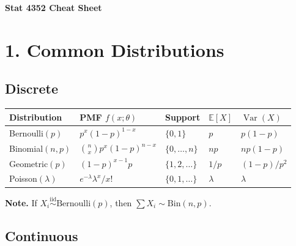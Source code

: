 \documentclass[11pt]{article}
\newcommand{\bbE}{\mathbb{E}}
\newcommand{\Var}{\operatorname{Var}}
\begin{document}
\begin{center}
  {\large\textbf{Stat 4352 Cheat Sheet}}
\end{center}

\section*{1.\; Common Distributions}

\subsection*{Discrete}

\renewcommand{\arraystretch}{1.4}
\begin{tabular}{lllll}
  \toprule
  \textbf{Distribution} & \textbf{PMF} $f(x;\theta)$ &
  \textbf{Support} & $\bbE[X]$ & $\Var(X)$ \\
  \midrule
  Bernoulli$(p)$ & $p^x(1-p)^{1-x}$ & $\{0,1\}$ & $p$ & $p(1-p)$ \\
  Binomial$(n,p)$ & $\binom{n}{x}p^x(1-p)^{n-x}$ & $\{0,\ldots,n\}$ &
  $np$ & $np(1-p)$ \\
  Geometric$(p)$ & $(1-p)^{x-1}p$ & $\{1,2,\ldots\}$ & $1/p$ & $(1-p)/p^2$ \\
  Poisson$(\lambda)$ & $e^{-\lambda}\lambda^x/x!$ & $\{0,1,\ldots\}$
  & $\lambda$ & $\lambda$ \\
  \bottomrule
\end{tabular}

\medskip
\noindent\textbf{Note.} If $X_i \overset{\mathrm{iid}}{\sim}
\mathrm{Bernoulli}(p)$, then $\sum X_i \sim \mathrm{Bin}(n,p)$.

\subsection*{Continuous}
\end{document}

